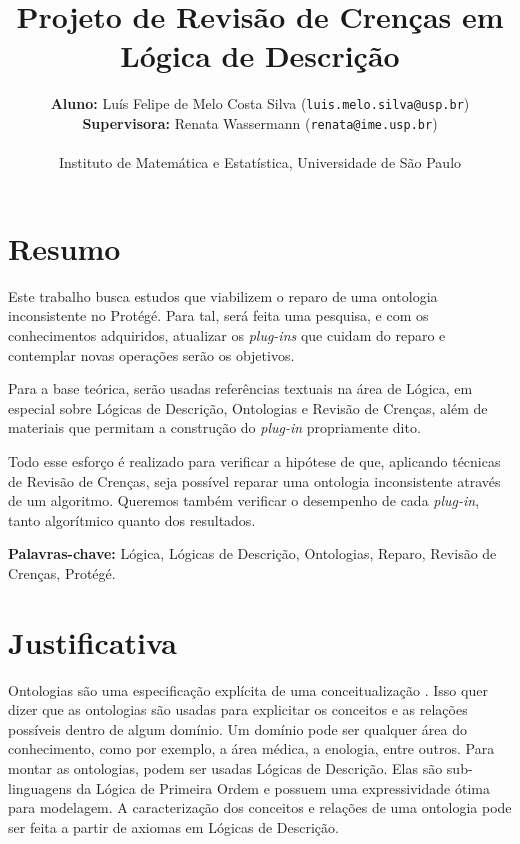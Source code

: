 \documentclass[12pt,letterpaper]{article}
\begin{document}
	
	\large
	
	\title{Projeto de Revisão de Crenças em Lógica de Descrição}
	\author{\textbf{Aluno:} Luís Felipe de Melo Costa Silva (\texttt{luis.melo.silva@usp.br})\\ 
		\textbf{Supervisora:} Renata Wassermann (\texttt{renata@ime.usp.br})\\ \\
		Instituto de Matemática e Estatística, Universidade de São Paulo}
	
	\maketitle
	
	\section{Resumo}
	
	Este trabalho busca estudos que viabilizem o reparo de uma ontologia inconsistente no Protégé. Para tal, será feita uma pesquisa, e com os conhecimentos adquiridos, atualizar os \textit{plug-ins} que cuidam do reparo e contemplar novas operações serão os objetivos.
	
	Para a base teórica, serão usadas referências textuais na área de Lógica, em especial sobre Lógicas de Descrição, Ontologias e Revisão de Crenças, além de materiais que permitam a construção do \textit{plug-in} propriamente dito.
	
	Todo esse esforço é realizado para verificar a hipótese de que, aplicando técnicas de Revisão de Crenças, seja possível reparar uma ontologia inconsistente através de um algoritmo. Queremos também verificar o desempenho de cada \textit{plug-in}, tanto algorítmico quanto dos resultados. 
	
	
	\textbf{Palavras-chave:} Lógica, Lógicas de Descrição, Ontologias, Reparo, Revisão de Crenças, Protégé.
	
	
	\clearpage
	
	\section{Justificativa} 
	
	Ontologias são uma especificação explícita de uma conceitualização \cite{gruber1995toward}. Isso quer dizer que as ontologias são usadas para explicitar os conceitos e as relações possíveis dentro de algum domínio. Um domínio pode ser qualquer área do conhecimento, como por exemplo, a área médica, a enologia, entre outros. Para montar as ontologias, podem ser usadas Lógicas de Descrição. Elas são sub-linguagens da Lógica de Primeira Ordem e possuem uma expressividade ótima para modelagem. A caracterização dos conceitos e relações de uma ontologia pode ser feita a partir de axiomas em Lógicas de Descrição. \\
	
\end{document}
